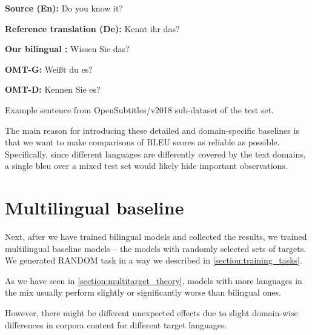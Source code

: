 \vspace{\baselineskip}
\begin{minipage}[t]{0.9\textwidth}

\textbf{Source (En):}  Do you know it? 

\textbf{Reference translation (De):} Kennt ihr das?

\textbf{Our bilingual :} Wissen Sie das?

\textbf{OMT-G:} Weißt du es?

\textbf{OMT-D:} Kennen Sie es?

	\begin{exmp}
	Example sentence from OpenSubtitles/v2018 sub-dataset of 
	the  test set.

	\label{exmp:biling_de_opensubtitles}
	\end{exmp}
\end{minipage}
\vspace{\baselineskip}

The main reason for introducing these detailed and domain-specific
baselines is that we want to make comparisons of BLEU scores as
reliable as possible.
Specifically, since different languages are differently covered by
the text domains, a single \acrshort{bleu} over a mixed test set would likely
hide important observations.

\section{Multilingual baseline}
\label{section:experiment_multilingual_baseline}

Next, after we have trained bilingual models and collected the results,
we trained multilingual baseline models -- the models with randomly
selected sets of targets.
We generated RANDOM task in a way we described in \cref{section:training_tasks}.

As we have seen in \cref{section:multitarget_theory}, models with more languages
in the mix usually perform slightly or significantly worse than bilingual ones.

However, there might be different unexpected effects due to slight domain-wise differences
in corpora content for different target languages.


